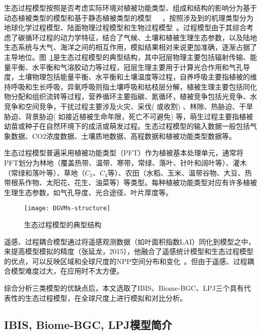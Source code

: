 生态过程模型按照是否考虑实际环境对植被功能类型、组成和结构的影响分为基于动态植被类型的模型和基于静态植被类型的模型~\cite{王绍刚2008森林碳循环模型方法研究进展}~\cite{王萍2009基于}~\cite{毛留喜2006陆地生态系统碳循环模型研究概述}，按照涉及到的机理类型分为地球化学过程模型、陆面物理过程模型和生物过程模型~\cite{谢馨瑶2018大尺度森林碳循环过程模拟模型综述}。过程模型由于其综合考虑了碳循环过程的动力学特征，结合了气候、土壤和植被生理生态参数，以及陆地生态系统与大气、海洋之间的相互作用，模拟结果相对来说更加准确，逐渐占据了主导地位。图~\ref{fig:DGVMs-structure}是生态过程模型的典型结构，其中冠层物理主要包括辐射传输、能量平衡、水平衡和气溶胶动力等过程，冠层生理主要用于计算光合作用和气孔导度，土壤物理包括能量平衡、水平衡和土壤温度等过程，自养呼吸主要指植被的维持呼吸和生长呼吸，异氧呼吸则指土壤呼吸和枯枝层分解，植被生理主要包括同化物分配和组织流转等过程，营养循环主要指碳、氮循环，植被竞争包括光竞争、水竞争和空间竞争，干扰过程主要涉及火灾、采伐( 或收割) 、林隙、热胁迫、干旱胁迫、背景胁迫( 如接近植被生命年限，死亡不可避免) 等，萌生过程主要指植被幼苗或种子在自然环境下的成活或萌发过程。生态过程模型的输入数据一般包括气象数据、CO2浓度数据、土壤质地数据、高程数据和植被功能类型数据等。

生态过程模型普遍采用植被功能类型（PFT）作为植被基本处理单元，通常将PFT划分为林地（覆盖热带、温带、寒带，常绿、落叶、针叶和阔叶等）、灌木（常绿和落叶等）、草地（$C_3$、$C_4$等）、农田（水稻、玉米、温带谷物、大豆、热带根系作物、太阳花、花生、油菜等）等类型。每种植被功能类型对应有许多植被生理生态参数，如气孔导度、光合途径、叶片厚度等。

\begin{figure}[!htbp]
    \centering
    \texttt{[image: DGVMs-structure]}
    \caption{生态过程模型的典型结构}
    \label{fig:DGVMs-structure}
\end{figure}

遥感、过程耦合模型通过将遥感观测数据（如叶面积指数LAI）同化到模型之中，来提高模型模拟的精度（张延龙，2015），他融合了遥感统计模型和生态过程模型的优点，可以反映区域和全球尺度的NPP空间分布和变化~\cite{朱文泉2005陆地植被净初级生产力计算模型研究进展}。但由于遥感、过程耦合模型难度过大，在应用时不太方便。

综合分析三类模型的优缺点后，本文选取了IBIS、Biome-BGC、LPJ三个具有代表性的生态过程模型，在全球尺度上进行模拟和对比分析。

\subsection{IBIS, Biome-BGC, LPJ模型简介}
